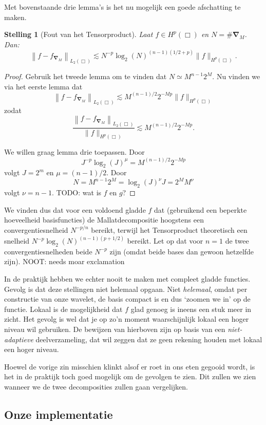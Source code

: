 \documentclass[11pt]{report}
\theoremstyle{plain}
\newtheorem*{stelling}{Stelling}
\theoremstyle{remark}
\begin{document}
Met bovenstaande drie lemma's is het nu mogelijk een goede afschatting te maken. 
\begin{stelling}[Fout van het Tensorproduct]
  Laat $f \in H^p(\Box)$ en $N = \#\boldsymbol{\nabla}_M$. Dan:
  \[
    \left\| f - f_{\boldsymbol\nabla_M} \right\|_{L_2(\Box)} \lesssim N^{-p} \log_2(N)^{(n-1)(1/2 + p)} \| f \|_{H^p(\Box)}.
  \]
\end{stelling}
\begin{proof}
  Gebruik het tweede lemma om te vinden dat $N \simeq M^{n-1}2^M$. Nu vinden we via het eerste lemma dat
  \[
    \left\| f - f_{\boldsymbol\nabla_M} \right\|_{L_2(\Box)} \lesssim M^{(n-1)/2}2^{-Mp}\| f \|_{H^p(\Box)}
  \]
  zodat
  \[
    \frac{\left\| f - f_{\boldsymbol\nabla_M}  \right\|_{L_2(\Box)}}{\| f \|_{H^p(\Box)}} \lesssim M^{(n-1)/2}2^{-Mp}.
  \]

  We willen graag lemma drie toepassen. Door
  \[
    J^{-p}\log_2(J)^\mu = M^{(n-1)/2} 2^{-Mp}
  \]
  volgt $J = 2^m$ en $\mu = (n-1)/2$. Door
  \[
    N = M^{n-1}2^M = \log_2(J)^\nu J = 2^M M^\nu
  \] volgt $\nu = n-1$. TODO: wat is $f$ en $g$?
\end{proof}

We vinden dus dat voor een voldoend gladde $f$ dat (gebruikend een beperkte hoeveelheid basisfuncties) de Mallatdecompositie hoogstens een convergentiesnelheid $N^{-p/n}$ bereikt, terwijl het Tensorproduct theoretisch een snelheid $N^{-p} \log_2(N)^{(n-1)(p+1/2)}$ bereikt. Let op dat voor $n=1$ de twee convergentiesnelheden beide $N^{-p}$ zijn (omdat beide bases dan gewoon hetzelfde zijn).
NOOT: needs moar exclamation

In de praktijk hebben we echter nooit te maken met compleet gladde functies. Gevolg is dat deze stellingen niet helemaal opgaan. Niet \emph{helemaal}, omdat per constructie van onze wavelet, de basis compact is en dus `zoomen we in' op de functie. Lokaal is de mogelijkheid dat $f$ glad genoeg is ineens een stuk meer in zicht. Het gevolg is wel dat je op zo'n moment waarschijnlijk lokaal een hoger niveau wil gebruiken. De bewijzen van hierboven zijn op basis van een \emph{niet-adaptieve} deelverzameling, dat wil zeggen dat ze geen rekening houden met lokaal een hoger niveau.

Hoewel de vorige zin misschien klinkt alsof er roet in ons eten gegooid wordt, is het in de praktijk toch goed mogelijk om de gevolgen te zien. Dit zullen we zien wanneer we de twee decomposities zullen gaan vergelijken.

\subsection{Onze implementatie}
\end{document}
